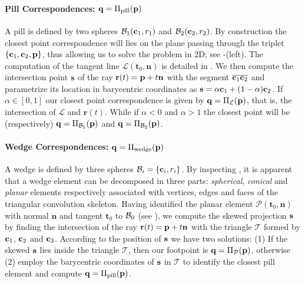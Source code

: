 
\paragraph{Pill Correspondences: $\mathbf{q}=\Pi_\text{pill}(\mathbf{p})$}
A pill is defined by two spheres $\mathcal{B}_1(\mathbf{c}_1,r_1)$ and $\mathcal{B}_2(\mathbf{c}_2,r_2)$. By construction the closest point correspondence will lies on the plane passing through the triplet $\{ \mathbf{c}_1, \mathbf{c}_2, \mathbf{p} \}$, thus allowing us to solve the problem in 2D; see -(left). The computation of the tangent line $\mathcal{L}(\mathbf{t}_0, \mathbf{n})$ is detailed in . We then compute the intersection point $\mathbf{s}$ of the ray $\mathbf{r}(t) = \mathbf{p} + t\mathbf{n}$ with the segment $\overline{\mathbf{c}_1 \mathbf{c}_2}$ and parametrize its location in barycentric coordinates as $\mathbf{s} = \alpha\mathbf{c}_1 + (1-\alpha)\mathbf{c}_2$. If $\alpha \in [0,1]$ our closest point correspondence is given by $\mathbf{q}=\Pi_\mathcal{L}(\mathbf{p})$, that is, the intersection of $\mathcal{L}$ and $\mathbf{r}(t)$. While if $\alpha<0$ and $\alpha>1$ the closest point will be (respectively) $\mathbf{q}=\Pi_{\mathcal{B}_1}(\mathbf{p})$ and $\mathbf{q}=\Pi_{\mathcal{B}_2}(\mathbf{p})$. 

\paragraph{Wedge Correspondences: $\mathbf{q}=\Pi_\text{wedge}(\mathbf{p})$}
A wedge is defined by three spheres $\mathcal{B}_i = \{\mathbf{c}_i, r_i\}$. By inspecting , it is apparent that a wedge element can be decomposed in three parts: \emph{spherical}, \emph{conical} and \emph{planar} elements respectively associated with vertices, edges and faces of the triangular convolution skeleton. Having identified the planar element $\mathcal{P}(\mathbf{t}_0,\mathbf{n})$ with normal $\mathbf{n}$ and tangent $\mathbf{t}_0$ to $\mathcal{B}_0$ (see ), we compute the skewed projection $\mathbf{s}$ by finding the intersection of the ray $\mathbf{r}(t) = \mathbf{p} + t\mathbf{n}$ with the triangle $\mathcal{T}$ formed by $\mathbf{c}_1$, $\mathbf{c}_2$ and $\mathbf{c}_3$. 
% 
According to the position of $\mathbf{s}$ we have two solutions:
(1) If the skewed $\mathbf{s}$ lies inside the triangle $\mathcal{T}$, then our footpoint is $\mathbf{q} = \Pi_\mathcal{P}(\mathbf{p})$, otherwise 
(2) employ the barycentric coordinates of $\mathbf{s}$ in $\mathcal{T}$ to identify the closest pill element and compute $\mathbf{q}=\Pi_\text{pill}(\mathbf{p})$.

